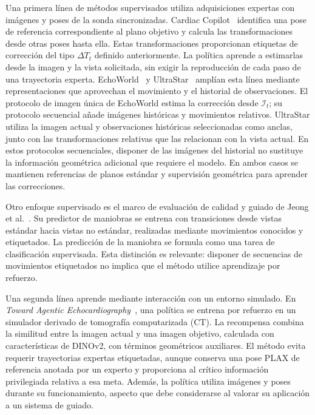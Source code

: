 \documentclass[10pt,a4paper]{article}
\begin{document}
Una primera línea de métodos supervisados utiliza adquisiciones expertas con imágenes y poses de la sonda sincronizadas. Cardiac Copilot~\cite{Jiang2024} identifica una pose de referencia correspondiente al plano objetivo y calcula las transformaciones desde otras poses hasta ella. Estas transformaciones proporcionan etiquetas de corrección del tipo $\Delta T_t$ definido anteriormente. La política aprende a estimarlas desde la imagen y la vista solicitada, sin exigir la reproducción de cada paso de una trayectoria experta. EchoWorld~\cite{Yue2025} y UltraStar~\cite{Wang2026} amplían esta línea mediante representaciones que aprovechan el movimiento y el historial de observaciones. El protocolo de imagen única de EchoWorld estima la corrección desde $\mathcal{I}_t$; su protocolo secuencial añade imágenes históricas y movimientos relativos. UltraStar utiliza la imagen actual y observaciones históricas seleccionadas como anclas, junto con las transformaciones relativas que las relacionan con la vista actual. En estos protocolos secuenciales, disponer de las imágenes del historial no sustituye la información geométrica adicional que requiere el modelo. En ambos casos se mantienen referencias de planos estándar y supervisión geométrica para aprender las correcciones.

Otro enfoque supervisado es el marco de evaluación de calidad y guiado de Jeong et al.~\cite{Jeong2026MultiTask}. Su predictor de maniobras se entrena con transiciones desde vistas estándar hacia vistas no estándar, realizadas mediante movimientos conocidos y etiquetados. La predicción de la maniobra se formula como una tarea de clasificación supervisada. Esta distinción es relevante: disponer de secuencias de movimientos etiquetados no implica que el método utilice aprendizaje por refuerzo.

Una segunda línea aprende mediante interacción con un entorno simulado. En \textit{Toward Agentic Echocardiography}~\cite{Jeong2026}, una política se entrena por refuerzo en un simulador derivado de tomografía computarizada (CT). La recompensa combina la similitud entre la imagen actual y una imagen objetivo, calculada con características de DINOv2, con términos geométricos auxiliares. El método evita requerir trayectorias expertas etiquetadas, aunque conserva una pose PLAX de referencia anotada por un experto y proporciona al crítico información privilegiada relativa a esa meta. Además, la política utiliza imágenes y poses durante su funcionamiento, aspecto que debe considerarse al valorar su aplicación a un sistema de guiado.
\end{document}
